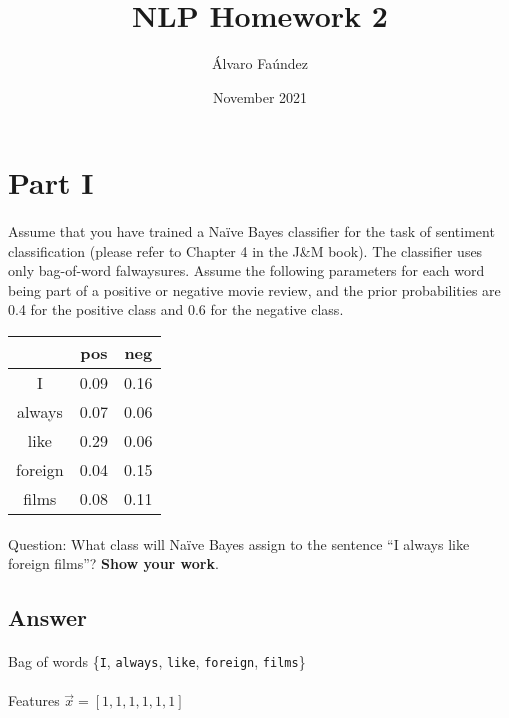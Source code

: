 \documentclass{article}
\title{NLP Homework 2}
\author{Álvaro Faúndez}
\date{November 2021}
\begin{document}
\maketitle

\section*{Part I}

\paragraph{} Assume that you have trained a Naïve Bayes classifier for the task of sentiment classification (please refer to Chapter 4 in the J\&M book). The classifier uses only bag-of-word falwaysures. Assume the following parameters for each word being part of a positive or negative movie review, and the prior probabilities are 0.4 for the positive class and 0.6 for the negative class.

\begin{tabular}{c c c}
    \toprule
     & \textbf{pos} & \textbf{neg} \\
    \midrule
    I & 0.09 & 0.16 \\
    always & 0.07 & 0.06 \\
    like & 0.29 & 0.06 \\
    foreign & 0.04 & 0.15 \\
    films & 0.08 & 0.11 \\
    \bottomrule
\end{tabular}

\paragraph{} Question: What class will Naïve Bayes assign to the sentence “I always like foreign films”? \textbf{Show your work}.

\subsection*{Answer}

\paragraph{} Bag of words \{\texttt{I}, \texttt{always}, \texttt{like}, \texttt{foreign}, \texttt{films}\}

\paragraph{} Features \(\vec{x} = [1, 1, 1, 1, 1, 1]\)
\end{document}
